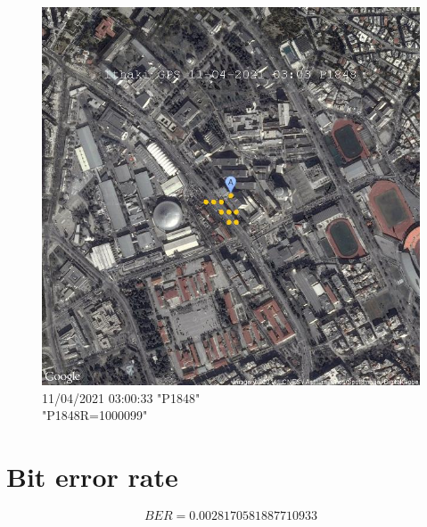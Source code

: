 \documentclass[hidelinks, 12pt, a4paper]{article}
\begin{document}
\begin{figure}[h!]
\centering
	\includegraphics[keepaspectratio, width=.8\textwidth]{gps.jpg}
    \caption{11/04/2021 03:00:33 "P1848" \\ "P1848R=1000099"} 
\end{figure}


\section{Bit error rate}

\[BER = 0.0028170581887710933\]
\end{document}

